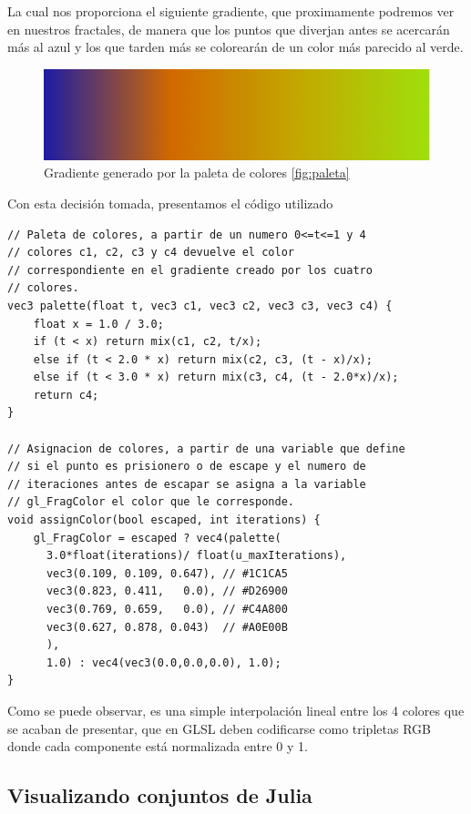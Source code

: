 La cual nos proporciona el siguiente gradiente, que proximamente podremos ver en nuestros fractales, de manera que los puntos que diverjan antes se acercarán más al azul y los que tarden más se colorearán de un color más parecido al verde.

\begin{figure} [ht]
    \centering
    \includegraphics[scale = 0.51]{img/C6/gradiente.png}
    \caption{Gradiente generado por la paleta de colores \ref{fig:paleta}}
    \label{fig:gradiente}
\end{figure}

Con esta decisión tomada, presentamos el código utilizado

\begin{lstlisting}
// Paleta de colores, a partir de un numero 0<=t<=1 y 4 
// colores c1, c2, c3 y c4 devuelve el color 
// correspondiente en el gradiente creado por los cuatro 
// colores.
vec3 palette(float t, vec3 c1, vec3 c2, vec3 c3, vec3 c4) {
    float x = 1.0 / 3.0;
    if (t < x) return mix(c1, c2, t/x);
    else if (t < 2.0 * x) return mix(c2, c3, (t - x)/x);
    else if (t < 3.0 * x) return mix(c3, c4, (t - 2.0*x)/x);
    return c4;
}

// Asignacion de colores, a partir de una variable que define
// si el punto es prisionero o de escape y el numero de 
// iteraciones antes de escapar se asigna a la variable 
// gl_FragColor el color que le corresponde.
void assignColor(bool escaped, int iterations) {
    gl_FragColor = escaped ? vec4(palette(
      3.0*float(iterations)/ float(u_maxIterations),
      vec3(0.109, 0.109, 0.647), // #1C1CA5
      vec3(0.823, 0.411,   0.0), // #D26900
      vec3(0.769, 0.659,   0.0), // #C4A800
      vec3(0.627, 0.878, 0.043)  // #A0E00B
      ), 
      1.0) : vec4(vec3(0.0,0.0,0.0), 1.0);
}
\end{lstlisting}

Como se puede observar, es una simple interpolación lineal entre los 4 colores que se acaban de presentar, que en GLSL deben codificarse como tripletas RGB donde cada componente está normalizada entre 0 y 1.

\subsection{Visualizando conjuntos de Julia}
\label{subsection:grafica-julia}


